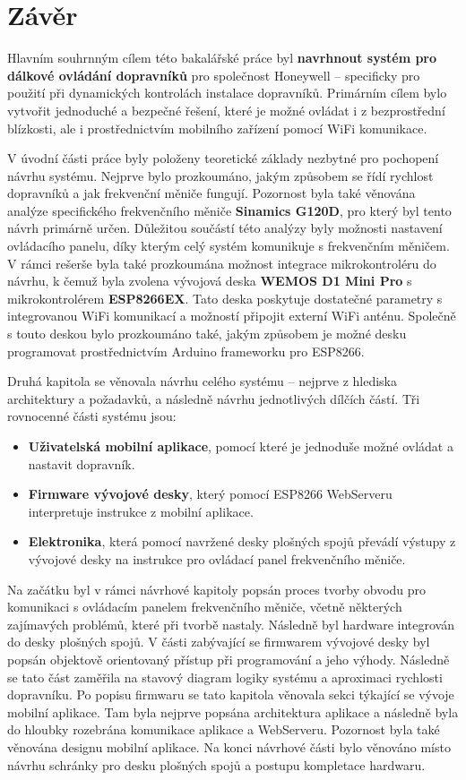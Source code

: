 \chapter*{Závěr}\label{chap:zaver}

Hlavním souhrnným cílem této bakalářské práce byl \textbf{navrhnout systém pro dálkové ovládání dopravníků} pro společnost Honeywell – specificky pro použití při dynamických kontrolách instalace dopravníků. Primárním cílem bylo vytvořit jednoduché a bezpečné řešení, které je možné ovládat i z bezprostřední blízkosti, ale i prostřednictvím mobilního zařízení pomocí WiFi komunikace.

V úvodní části práce byly položeny teoretické základy nezbytné pro pochopení návrhu systému. Nejprve bylo prozkoumáno, jakým způsobem se řídí rychlost dopravníků a jak frekvenční měniče fungují. Pozornost byla také věnována analýze specifického frekvenčního měniče \textbf{Sinamics G120D}, pro který byl tento návrh primárně určen. Důležitou součástí této analýzy byly možnosti nastavení ovládacího panelu, díky kterým celý systém komunikuje s frekvenčním měničem. V rámci rešerše byla také prozkoumána možnost integrace mikrokontroléru do návrhu, k čemuž byla zvolena vývojová deska \textbf{WEMOS D1 Mini Pro} s mikrokontrolérem \textbf{ESP8266EX}. Tato deska poskytuje dostatečné parametry s integrovanou WiFi komunikací a možností připojit externí WiFi anténu. Společně s touto deskou bylo prozkoumáno také, jakým způsobem je možné desku programovat prostřednictvím Arduino frameworku pro ESP8266.

Druhá kapitola se věnovala návrhu celého systému – nejprve z hlediska architektury a požadavků, a následně návrhu jednotlivých dílčích částí. Tři rovnocenné části systému jsou:
\begin{itemize}
	\item \textbf{Uživatelská mobilní aplikace}, pomocí které je jednoduše možné ovládat a nastavit dopravník.
	\item \textbf{Firmware vývojové desky}, který pomocí ESP8266 WebServeru interpretuje instrukce z mobilní aplikace.
	\item \textbf{Elektronika}, která pomocí navržené desky plošných spojů převádí výstupy z vývojové desky na instrukce pro ovládací panel frekvenčního měniče.
\end{itemize}
Na začátku byl v rámci návrhové kapitoly popsán proces tvorby obvodu pro komunikaci s ovládacím panelem frekvenčního měniče, včetně některých zajímavých problémů, které při tvorbě nastaly. Následně byl hardware integrován do desky plošných spojů. V části zabývající se firmwarem vývojové desky byl popsán objektově orientovaný přístup při programování a jeho výhody. Následně se tato část zaměřila na stavový diagram logiky systému a aproximaci rychlosti dopravníku. Po popisu firmwaru se tato kapitola věnovala sekci týkající se vývoje mobilní aplikace. Tam byla nejprve popsána architektura aplikace a následně byla do hloubky rozebrána komunikace aplikace a WebServeru. Pozornost byla také věnována designu mobilní aplikace. Na konci návrhové části bylo věnováno místo návrhu schránky pro desku plošných spojů a postupu kompletace hardwaru.

